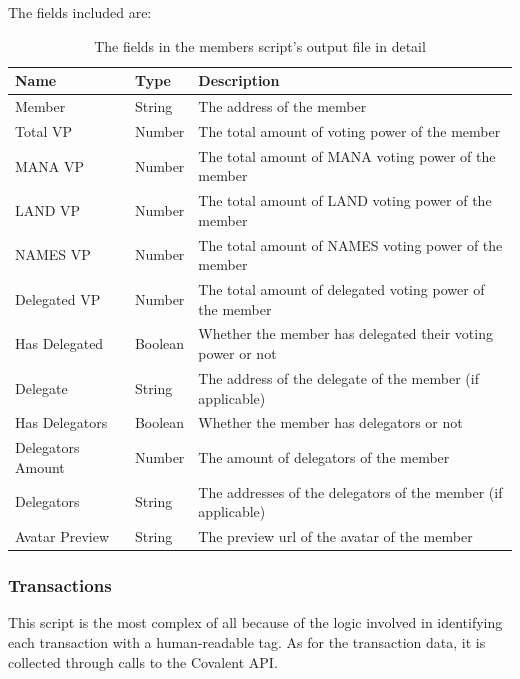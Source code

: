 \documentclass[MSE,Master,english]{twbook}%
\begin{document}
The fields included are:
\begin{table}[H]
  \centering
  \begin{tabularx}{\textwidth}{|l|l|X|}
  \hline
  \textbf{Name} & \textbf{Type} & \textbf{Description}                                        \\ \hline
  Member            & String  & The address of the member                                     \\ \hline
  Total VP          & Number  & The total amount of voting power of the member                \\ \hline
  MANA VP           & Number  & The total amount of MANA voting power of the member           \\ \hline
  LAND VP           & Number  & The total amount of LAND voting power of the member           \\ \hline
  NAMES VP          & Number  & The total amount of NAMES voting power of the member          \\ \hline
  Delegated VP      & Number  & The total amount of delegated voting power of the member      \\ \hline
  Has Delegated     & Boolean & Whether the member has delegated their voting power or not    \\ \hline
  Delegate          & String  & The address of the delegate of the member (if applicable)     \\ \hline
  Has Delegators    & Boolean & Whether the member has delegators or not                      \\ \hline
  Delegators Amount & Number  & The amount of delegators of the member                        \\ \hline
  Delegators        & String  & The addresses of the delegators of the member (if applicable) \\ \hline
  Avatar Preview    & String  & The preview url of the avatar of the member                   \\ \hline
  \end{tabularx}
  \caption{The fields in the members script's output file in detail}
  \label{table:members}
\end{table}

\subsubsection{Transactions}
This script is the most complex of all because of the logic involved in identifying each transaction with a human-readable tag. As for the transaction data, it is collected through calls to the Covalent API.
\end{document}
